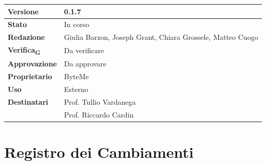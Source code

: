\documentclass[11pt,a4paper]{article}
\newcommand{\gls}[1]{#1\textsubscript{G}}
\begin{document}
\begin{titlepage}
    \begin{table}[H]
        \centering
        \begin{tabular}{|l|p{5cm}|}
            \hline
            \textbf{Versione} & 0.1.7 \\
            \hline
            \textbf{Stato} & In corso \\
            \hline
            \textbf{Redazione} & Giulia Barzon, Joseph Grant, Chiara Grossele, Matteo Cuogo\\
            \hline
            \textbf{\gls{Verifica}} & Da verificare\\
            \hline
            \textbf{Approvazione} & Da approvare\\
            \hline
            \textbf{Proprietario} & ByteMe \\
            \hline
            \textbf{Uso} & Esterno \\
            \hline
            \textbf{Destinatari} & Prof. Tullio Vardanega \\ & Prof. Riccardo Cardin \\
            \hline
        \end{tabular}
    \end{table}
    
    \vfill
\end{titlepage}

\thispagestyle{empty}
\section*{Registro dei Cambiamenti}
\end{document}
